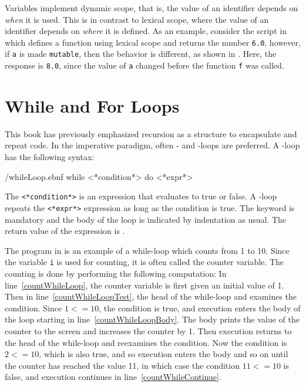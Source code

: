 \documentclass[fsharpNotes.tex]{subfiles}
\begin{document}
Variables implement dynamic scope, that is, the value of an identifier depends on \emph{when} it is used. This is in contrast to lexical scope, where the value of an identifier depends on \emph{where} it is defined. As an example, consider the script in  which defines a function using lexical scope and returns the number \lstinline!6.0!, however, if \lstinline!a! is made \lstinline!mutable!, then the behavior is different, as shown in .
%
%
Here, the response is \lstinline!8.0!, since the value of \lstinline!a! changed before the function \lstinline!f! was called.

\section{While and For Loops}
\label{chap:flow}
This book has previously emphasized recursion as a structure to encapsulate and repeat code. In the imperative paradigm, often - and -loops are preferred. A -loop has the following syntax:
%
\begin{verbatimwrite}{\ebnf/whileLoop.ebnf}
while <*condition*> do
  <*expr*>
\end{verbatimwrite}
%
The  \lstinline[language=syntax]{<*condition*>} is an expression that evaluates to true or false. A -loop repeats the \lstinline[language=syntax]{<*expr*>} expression as long as the condition is true.  The  keyword is mandatory and the body of the loop is indicated by indentation as usual. The return value of the  expression is \lexeme{()}.

The program in  is an example of a while-loop which counts from 1 to 10.
%
%
Since the variable \lstinline{i} is used for counting, it is often called the counter variable. The counting is done by performing the following computation: In line~\ref{countWhileLoop}, the counter variable is first given an initial value of 1. Then in line~\ref{countWhileLoopTest}, the head of the while-loop and examines the condition. Since $1 <= 10$, the condition is true, and execution enters the body of the loop starting in line~\ref{countWhileLoopBody}. The body prints the value of the counter to the screen and increases the counter by 1. Then execution returns to the head of the while-loop and reexamines the condition. Now the condition is $2 <= 10$, which is also true, and so execution enters the body and so on until the counter has reached the value 11, in which case the condition $11 <= 10$ is false, and execution continues in line~\ref{countWhileContinue}.
\end{document}
